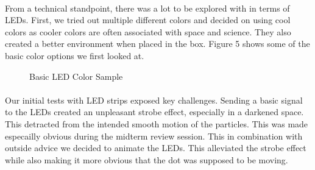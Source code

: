 \documentclass{article}
\begin{document}
\paragraph{}From a technical standpoint, there was a lot to be explored with in terms of LEDs. First, we tried out multiple different colors and decided on using cool colors as cooler colors are often associated with space and science. They also created a better environment when placed in the box. Figure 5 shows some of the basic color options we first looked at. 
\begin{figure}
    \centering
    \caption{Basic LED Color Sample}
\end{figure}

\paragraph{}Our initial tests with LED strips exposed key challenges. Sending a basic signal to the LEDs created an unpleasant strobe effect, especially in a darkened space. This detracted from the intended smooth motion of the particles. This was made especailly obvious during the midterm review session. This in combination with outside advice we decided to animate the LEDs. This alleviated the strobe effect while also making it more obvious that the dot was supposed to be moving. 
\end{document}

